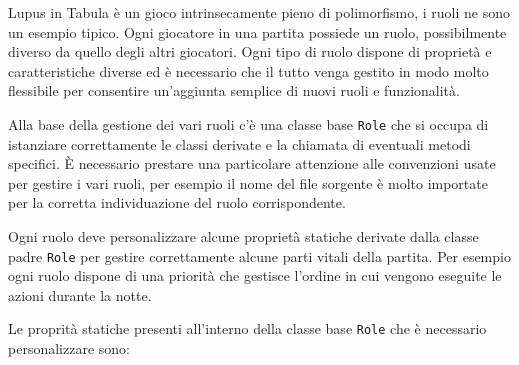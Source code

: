 Lupus in Tabula è un gioco intrinsecamente pieno di polimorfismo, i ruoli ne sono un esempio tipico. Ogni giocatore in una partita possiede un ruolo, possibilmente diverso da quello degli altri giocatori. Ogni tipo di ruolo dispone di proprietà e caratteristiche diverse ed è necessario che il tutto venga gestito in modo molto flessibile per consentire un'aggiunta semplice di nuovi ruoli e funzionalità. 

Alla base della gestione dei vari ruoli c'è una classe base \texttt{Role} che si occupa di istanziare correttamente le classi derivate e la chiamata di eventuali metodi specifici. È necessario prestare una particolare attenzione alle convenzioni usate per gestire i vari ruoli, per esempio il nome del file sorgente è molto importate per la corretta individuazione del ruolo corrispondente.

Ogni ruolo deve personalizzare alcune proprietà statiche derivate dalla classe padre \texttt{Role} per gestire correttamente alcune parti vitali della partita. Per esempio ogni ruolo dispone di una priorità che gestisce l'ordine in cui vengono eseguite le azioni durante la notte.

Le proprità statiche presenti all'interno della classe base \texttt{Role} che è necessario personalizzare sono:

